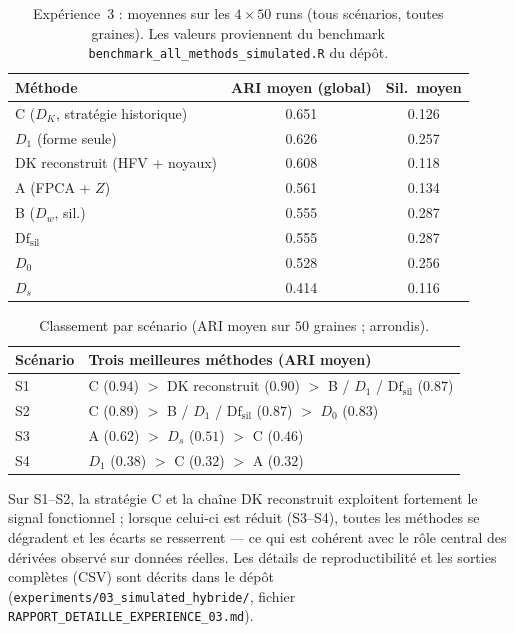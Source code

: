 \documentclass[11pt, a4paper]{article}
\newcommand{\Dw}{D_w}
\newcommand{\DK}{D_K}
\begin{document}
\begin{table}[H]
\centering
\renewcommand{\arraystretch}{1.25}
\begin{tabular}{lcc}
  \toprule
  \textbf{Méthode} & \textbf{ARI moyen (global)} & \textbf{Sil.\ moyen} \\
  \midrule
  C ($\DK$, stratégie historique) & 0.651 & 0.126 \\
  $D_1$ (forme seule)               & 0.626 & 0.257 \\
  DK reconstruit (HFV + noyaux)    & 0.608 & 0.118 \\
  A (FPCA + $Z$)                   & 0.561 & 0.134 \\
  B ($\Dw$, sil.)                  & 0.555 & 0.287 \\
  $\mathrm{Df}_{\mathrm{sil}}$     & 0.555 & 0.287 \\
  $D_0$                            & 0.528 & 0.256 \\
  $D_s$                            & 0.414 & 0.116 \\
  \bottomrule
\end{tabular}
\caption{Expérience~3 : moyennes sur les $4 \times 50$ runs (tous scénarios,
toutes graines). Les valeurs proviennent du benchmark \texttt{benchmark\_all\_methods\_simulated.R} du dépôt.}
\label{tab:sim_global}
\end{table}

\begin{table}[H]
\centering
\renewcommand{\arraystretch}{1.2}
\small
\begin{tabular}{lp{7.2cm}}
  \toprule
  \textbf{Scénario} & \textbf{Trois meilleures méthodes (ARI moyen)} \\
  \midrule
  S1 & C ($0.94$) $>$ DK reconstruit ($0.90$) $>$ B / $D_1$ / $\mathrm{Df}_{\mathrm{sil}}$ ($0.87$) \\
  S2 & C ($0.89$) $>$ B / $D_1$ / $\mathrm{Df}_{\mathrm{sil}}$ ($0.87$) $>$ $D_0$ ($0.83$) \\
  S3 & A ($0.62$) $>$ $D_s$ ($0.51$) $>$ C ($0.46$) \\
  S4 & $D_1$ ($0.38$) $>$ C ($0.32$) $>$ A ($0.32$) \\
  \bottomrule
\end{tabular}
\caption{Classement par scénario (ARI moyen sur $50$ graines ; arrondis).}
\label{tab:sim_ranking}
\end{table}

Sur S1--S2, la stratégie C et la chaîne DK reconstruit exploitent fortement
le signal fonctionnel ; lorsque celui-ci est réduit (S3--S4), toutes les
méthodes se dégradent et les écarts se resserrent — ce qui est cohérent avec
le rôle central des dérivées observé sur données réelles. Les détails de
reproductibilité et les sorties complètes (CSV) sont décrits dans le dépôt
(\texttt{experiments/03\_simulated\_hybride/}, fichier
\texttt{RAPPORT\_DETAILLE\_EXPERIENCE\_03.md}).
\end{document}
